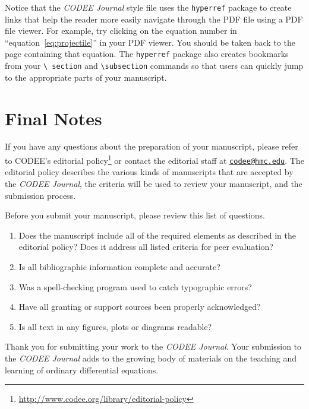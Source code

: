 \documentclass{codee}
\theoremstyle{definition}
\theoremstyle{remark}
\numberwithin{equation}{section}
\begin{document}
Notice that the \textit{CODEE Journal} style file uses the
\texttt{hyperref} package to create links that help the reader more
easily navigate through the PDF file using a PDF file viewer.  For
example, try clicking on the equation number in
``equation~\eqref{eq:projectile}'' in your PDF viewer. You should be
taken back to the page containing that equation. The \texttt{hyperref}
package also creates bookmarks from your \texttt{\textbackslash
  section} and \texttt{\textbackslash subsection} commands so that
users can quickly jump to the appropriate parts of your manuscript.

\section{Final Notes}

If you have any questions about the preparation of your manuscript,
please refer to CODEE's editorial
policy\footnote{\url{http://www.codee.org/library/editorial-policy}}
or contact the editorial staff at
\href{mailto:codee@hmc.edu}{\texttt{codee@hmc.edu}}. The editorial
policy describes the various kinds of manuscripts that are accepted by
the \textit{CODEE Journal}, the criteria will be used to review your
manuscript, and the submission process.

Before you submit your manuscript, please review this list of questions.
\begin{enumerate}
\item Does the manuscript include all of the required elements as
  described in the editorial policy? Does it address all listed criteria for peer evaluation?
\item Is all bibliographic information complete and accurate?
\item Was a spell-checking program used to catch typographic errors?
\item Have all granting or support sources been properly acknowledged?
\item Is all text in any figures, plots or diagrams readable?
\end{enumerate}

Thank you for submitting your work to the \textit{CODEE Journal}. Your
submission to the \textit{CODEE Journal} adds to the growing body of
materials on the teaching and learning of ordinary differential
equations.


{}
\nocite{*}
\end{document}
